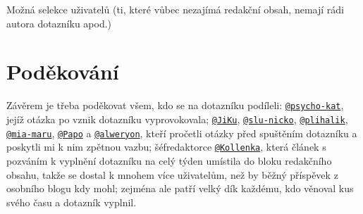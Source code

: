 \documentclass[12pt, a4paper, twoside]{article}
\makeatletter
\newcommand{\suser}[1]{\href{https://www.signaly.cz/#1}{\texttt{@#1}}}
\makeatother
\begin{document}
Možná selekce uživatelů (ti, které vůbec nezajímá redakční obsah,
nemají rádi autora dotazníku apod.)

\section*{Poděkování}

Závěrem je třeba poděkovat všem, kdo se na dotazníku podíleli:
\suser{psycho-kat}, jejíž otázka po 
vznik dotazníku vyprovokovala;
\suser{JiKu}, \suser{slu-nicko}, \suser{plihalik}, \suser{mia-maru},
\suser{Papo} a \suser{alweryon}, kteří pročetli otázky před spuštěním
dotazníku a poskytli mi k nim zpětnou vazbu;
šéfredaktorce \suser{Kollenka}, která článek s pozváním k vyplnění
dotazníku na celý týden umístila do bloku redakčního obsahu,
takže se dostal
k mnohem více uživatelům, než by běžný příspěvek z osobního blogu
kdy mohl;
zejména ale patří velký dík každému, kdo věnoval kus svého času
a dotazník vyplnil.

\tableofcontents

\printbibliography
\end{document}
